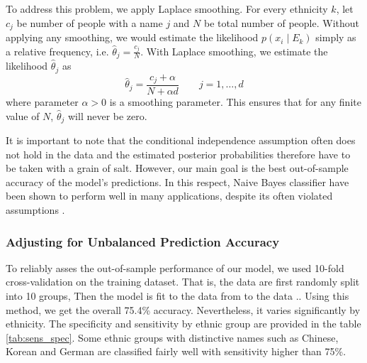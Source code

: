 To address this problem, we apply Laplace smoothing. 
For every ethnicity $k$, let $c_j$ be number of people with a name $j$ and $N$ be total number of people.  Without applying any smoothing, we would estimate the likelihood  $p(x_i \mid E_k)$ simply as a relative frequency, i.e. $\hat\theta_j = \frac{c_j}{N}$. With  Laplace smoothing, we estimate  the  likelihood $\hat\theta_j$ as 
\begin{equation}
    \hat\theta_j = \frac{c_j + \alpha}{N + \alpha d} \qquad j = 1, \dots, d
\end{equation}
where parameter $\alpha > 0 $ is a smoothing parameter.  This ensures that for any finite value of $N$,  $\hat\theta_j$ will never be zero. %




It is important to note that the conditional independence assumption often does not hold in the data and the estimated posterior probabilities therefore have to be taken with a grain of salt. %
However, our main goal is the best out-of-sample accuracy of the model's predictions. In this respect, Naive Bayes classifier have been shown to perform  well in many applications, despite its often violated assumptions \citep{domingos_optimality_1997}.

\subsubsection{Adjusting for Unbalanced Prediction Accuracy}
To reliably asses the out-of-sample performance of our model, we used 10-fold cross-validation on the training dataset. That is, the data are first randomly split into 10 groups, Then the model is fit to the data from to the data ..  
Using this method, we get the overall 75.4\% accuracy. Nevertheless, it varies
significantly by ethnicity. The specificity and sensitivity by ethnic group are provided in the table \ref{tab:sens_spec}. Some ethnic groups with distinctive names such as Chinese, Korean and German are classified fairly well with sensitivity higher than 75\%. 

